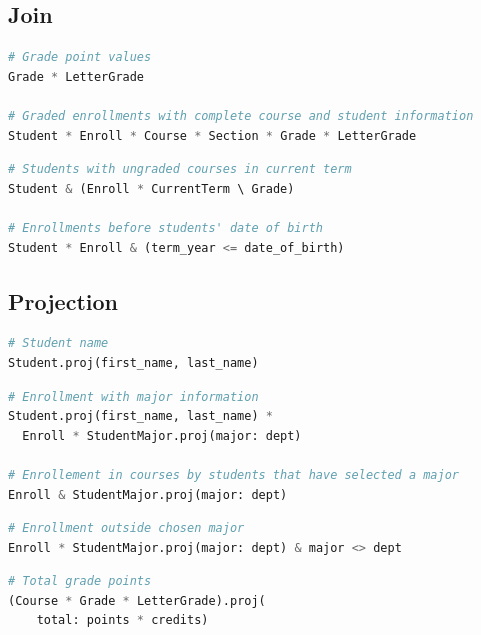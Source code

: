 \documentclass[letter,10pt]{article}
\begin{document}
\subsection{Join}
\begin{lstlisting}[language=Python, caption={Combining entities.}, label={lst:join1}]
# Grade point values
Grade * LetterGrade

# Graded enrollments with complete course and student information
Student * Enroll * Course * Section * Grade * LetterGrade
\end{lstlisting}

\begin{lstlisting}[language=Python, caption={Join in expressions.}, label={lst:join2}]
# Students with ungraded courses in current term
Student & (Enroll * CurrentTerm \ Grade)

# Enrollments before students' date of birth
Student * Enroll & (term_year <= date_of_birth)
\end{lstlisting}

\subsection{Projection}
\begin{lstlisting}[language=Python, caption={Selecting  attributes.}, label={lst:select}]
# Student name
Student.proj(first_name, last_name)
\end{lstlisting}

\begin{lstlisting}[language=Python, caption={Renaming attributes.}, label={lst:rename}]
# Enrollment with major information
Student.proj(first_name, last_name) * 
  Enroll * StudentMajor.proj(major: dept)

# Enrollement in courses by students that have selected a major
Enroll & StudentMajor.proj(major: dept)
\end{lstlisting}

\begin{lstlisting}[language=Python, caption={Projection in composite expressions.}, label={lst:proj}]
# Enrollment outside chosen major
Enroll * StudentMajor.proj(major: dept) & major <> dept
\end{lstlisting}

\begin{lstlisting}[language=Python, caption={Extension: calculated attributes.}, label={lst:extend}]
# Total grade points
(Course * Grade * LetterGrade).proj(
    total: points * credits)
\end{lstlisting}
\end{document}
